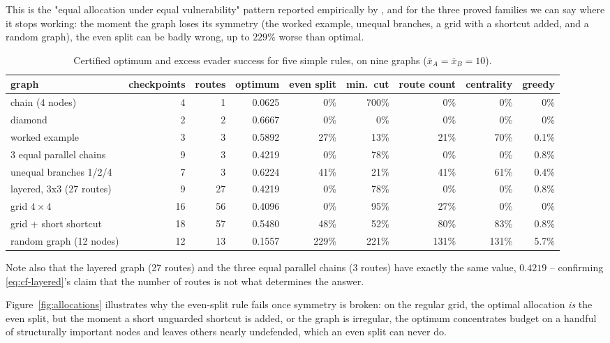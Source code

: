 \documentclass[11pt,a4paper]{article}
\theoremstyle{plain}
\theoremstyle{definition}
\newcommand{\XA}{\bar{x}_A}
\newcommand{\XB}{\bar{x}_B}
\begin{document}
This is the "equal allocation under equal vulnerability" pattern
reported empirically by \citet{ramirez2011}, and for the three proved
families we can say where it stops working: the moment the graph loses
its symmetry (the worked example, unequal branches, a grid with a
shortcut added, and a random graph), the even split can be badly wrong,
up to $229\%$ worse than optimal.

\begin{table}[htbp]
\centering
\caption{Certified optimum and excess evader success for five simple
rules, on nine graphs ($\XA=\XB=10$).}
\label{tab:e3}
\footnotesize
\setlength{\tabcolsep}{3.2pt}
\begin{tabular}{p{2.6cm}rrrrrrrr}
\toprule
graph & checkpoints & routes & optimum &
even split & min.\ cut & route count & centrality & greedy\\
\midrule
chain (4 nodes)          & 4  & 1  & 0.0625 & 0\%   & 700\% & 0\%   & 0\%   & 0\%\\
diamond                  & 2  & 2  & 0.6667 & 0\%   & 0\%   & 0\%   & 0\%   & 0\%\\
worked example            & 3  & 3  & 0.5892 & 27\%  & 13\%  & 21\%  & 70\%  & 0.1\%\\
3 equal parallel chains   & 9  & 3  & 0.4219 & 0\%   & 78\%  & 0\%   & 0\%   & 0.8\%\\
unequal branches 1/2/4    & 7  & 3  & 0.6224 & 41\%  & 21\%  & 41\%  & 61\%  & 0.4\%\\
layered, 3x3 (27 routes)  & 9  & 27 & 0.4219 & 0\%   & 78\%  & 0\%   & 0\%   & 0.8\%\\
grid $4\times4$           & 16 & 56 & 0.4096 & 0\%   & 95\%  & 27\%  & 0\%   & 0\%\\
grid + short shortcut     & 18 & 57 & 0.5480 & 48\%  & 52\%  & 80\%  & 83\%  & 0.8\%\\
random graph (12 nodes)   & 12 & 13 & 0.1557 & 229\% & 221\% & 131\% & 131\% & 5.7\%\\
\bottomrule
\end{tabular}
\end{table}

Note also that the layered graph (27 routes) and the three equal parallel
chains (3 routes) have exactly the same value, $0.4219$ -- confirming
\eqref{eq:cf-layered}'s claim that the number of routes is not what
determines the answer.

Figure~\ref{fig:allocations} illustrates why the even-split rule fails
once symmetry is broken: on the regular grid, the optimal allocation
\emph{is} the even split, but the moment a short unguarded shortcut is
added, or the graph is irregular, the optimum concentrates budget on a
handful of structurally important nodes and leaves others nearly
undefended, which an even split can never do.
\end{document}
